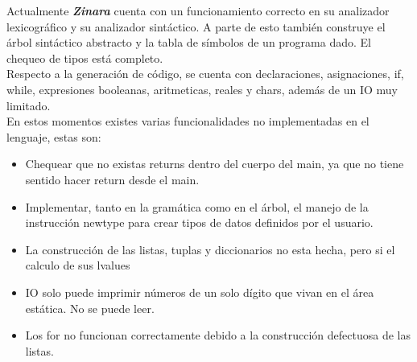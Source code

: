 \documentclass[12pt, spanish]{report}
\begin{document}
Actualmente \emph{\textbf{Zinara}} cuenta con un funcionamiento
correcto en su analizador lexicogr\'afico y su analizador sint\'actico. A
parte de esto tambi\'en construye el \'arbol sint\'actico abstracto y la
tabla de s\'imbolos de un programa dado. El chequeo de tipos est\'a completo.\\
\indent Respecto a la generaci\'on de c\'odigo, se cuenta con declaraciones,
asignaciones, if, while, expresiones booleanas, aritmeticas, reales y chars,
adem\'as de un IO muy limitado.\\
\indent En estos momentos existes varias funcionalidades no
implementadas en el lenguaje, estas son:
\begin{itemize}
\item Chequear que no existas returns dentro del cuerpo del main, ya que
      no tiene sentido hacer return desde el main.
\item Implementar, tanto en la gram\'atica como en el \'arbol, el manejo
      de la instrucci\'on newtype para crear tipos de datos definidos
      por el usuario.
\item La construcci\'on de las listas, tuplas y diccionarios no esta hecha,
      pero si el calculo de sus lvalues
\item IO solo puede imprimir n\'umeros de un solo d\'igito que vivan en el
      \'area est\'atica. No se puede leer.
\item Los for no funcionan correctamente debido a la construcci\'on defectuosa
      de las listas.
\end{itemize}



\end{document}
